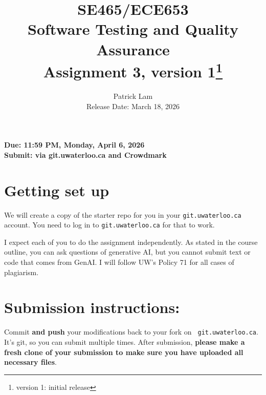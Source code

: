 \documentclass[10pt,hidelinks]{article}
\begin{document}
\title{
SE465/ECE653 \\
Software Testing and Quality Assurance\\
Assignment 3, version 1\footnote{version 1: initial release}}
\author{Patrick Lam \\
{Release Date:  March 18, 2026} \\
}
\renewcommand{\today}{}
\maketitle

\begin{center}

{\bf Due:  11:59 PM, Monday, April 6, 2026} \\
{\bf Submit: via git.uwaterloo.ca and Crowdmark}\\
\end{center}

\section*{Getting set up}
We will create a copy of the starter repo for you in your {\tt git.uwaterloo.ca} account. You need to log in to {\tt git.uwaterloo.ca} for that to work.



I expect each of you to do the assignment independently. As stated in the course outline, you can ask questions of generative AI, but you cannot submit text or code that comes from GenAI. I will follow UW's Policy 71 for all cases of plagiarism.
 
 \section*{Submission instructions:} 
Commit {\bf and push} your modifications back to your fork on {\tt
  git.uwaterloo.ca}.  It's git, so you can submit multiple times. After
submission, {\bf please make a fresh clone of your submission to make sure you
  have uploaded all necessary files}.
 
\end{document}
